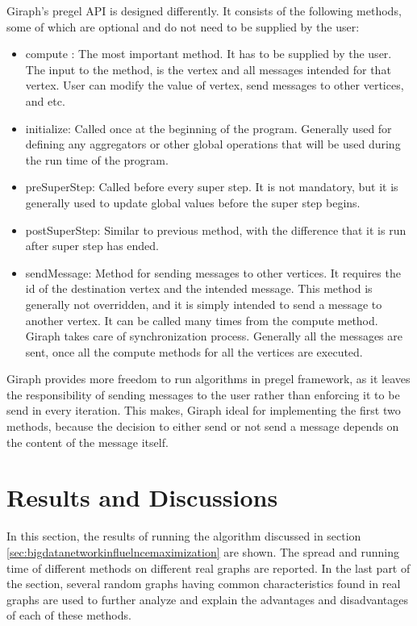 \documentclass[english]{tktltiki}
\begin{document}
Giraph's pregel API is designed differently. 
It consists of the following methods, some of which are optional and do not need to be supplied by the user:
\begin{itemize}
\item compute : The most important method. 
It has to be supplied by the user. 
The input to the method, is the vertex and all messages intended for that vertex. 
User can modify the value of vertex, send messages to other vertices, and etc.
\item initialize: Called once at the beginning of the program. 
Generally used for defining any aggregators or other global operations that will be used during the run time of the program.
\item preSuperStep: Called before every super step. 
It is not mandatory, but it is generally used to update global values before the super step begins.
\item postSuperStep: Similar to previous method, with the difference that it is run after super step has ended.
\item sendMessage: Method for sending messages to other vertices. 
It requires the id of the destination vertex and the intended message. 
This method is generally not overridden, and it is simply intended to send a message to another vertex. 
It can be called many times from the compute method. 
Giraph takes care of synchronization process.
Generally all the messages are sent, once all the compute methods for all the vertices are executed.
\end{itemize}

Giraph provides more freedom to run algorithms in pregel framework, as it leaves the responsibility of sending messages to the user rather than enforcing it to be send in every iteration. 
This makes, Giraph ideal for implementing the first two methods, because the decision to either send or not send a message depends on the content of the message itself.

\newpage

\section{Results and Discussions}
\label{sec:resanddis}
In this section, the results of running the algorithm discussed in section \ref{sec:bigdatanetworkinfluelncemaximization} are shown. 
The spread and running time of different methods on different real graphs are reported. 
In the last part of the section, several random graphs having common characteristics found in real graphs are used to further analyze and explain the advantages and disadvantages of each of these methods.
\end{document}
